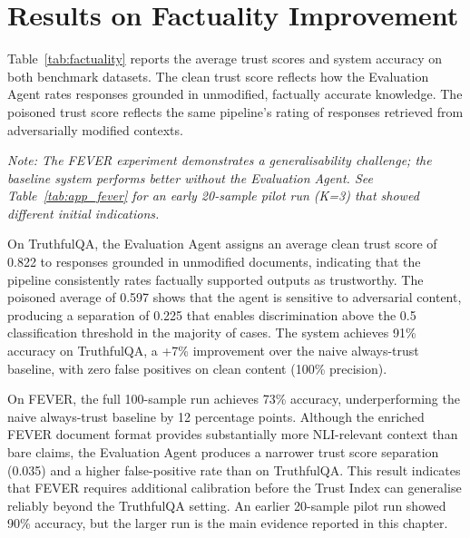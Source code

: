 \section{Results on Factuality Improvement}
\label{sec:ch6_factuality}

Table~\ref{tab:factuality} reports the average trust scores and system accuracy on both
benchmark datasets. The clean trust score reflects how the Evaluation Agent rates responses
grounded in unmodified, factually accurate knowledge. The poisoned trust score reflects the
same pipeline's rating of responses retrieved from adversarially modified contexts.

\begin{table}[h]
\centering
\caption{Trust score and accuracy comparison across benchmark datasets (100 samples per dataset, $K=5$).}
\label{tab:factuality}
\end{table}
\small\textit{Note: The FEVER experiment demonstrates a generalisability challenge; the baseline system performs better without the Evaluation Agent. See Table~\ref{tab:app_fever} for an early 20-sample pilot run (K=3) that showed different initial indications.}

\normalsize
On TruthfulQA, the Evaluation Agent assigns an average clean trust score of 0.822 to
responses grounded in unmodified documents, indicating that the pipeline consistently
rates factually supported outputs as trustworthy. The poisoned average of 0.597 shows
that the agent is sensitive to adversarial content, producing a separation of 0.225 that
enables discrimination above the 0.5 classification threshold in the majority of cases.
The system achieves 91\% accuracy on TruthfulQA, a +7\% improvement over the naive
always-trust baseline, with zero false positives on clean content (100\% precision).

On FEVER, the full 100-sample run achieves 73\% accuracy, underperforming the naive
always-trust baseline by 12 percentage points. Although the enriched FEVER document
format provides substantially more NLI-relevant context than bare claims, the Evaluation
Agent produces a narrower trust score separation (0.035) and a higher false-positive rate
than on TruthfulQA. This result indicates that FEVER requires additional calibration before
the Trust Index can generalise reliably beyond the TruthfulQA setting. An earlier
20-sample pilot run showed 90\% accuracy, but the larger run is the main evidence reported
in this chapter.


